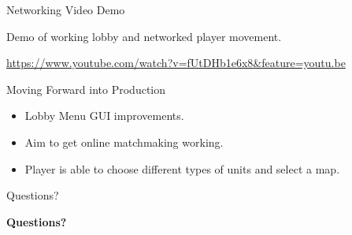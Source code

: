 \documentclass{beamer}
\begin{document}
\begin{frame}{Networking Video Demo}
	\begin{center}
	Demo of working lobby and networked player movement.
	\par
		\url{https://www.youtube.com/watch?v=fUtDHb1e6x8&feature=youtu.be}
	\end{center}
\end{frame}

\begin{frame}{Moving Forward into Production}
	\begin{itemize}
		\item Lobby Menu GUI improvements. \pause
		\item Aim to get online matchmaking working. \pause
		\item Player is able to choose different types of units and select a map.
	\end{itemize}
\end{frame}
\begin{frame}{Questions?}
\begin{center}
\textbf{Questions?}
\end{center}
\end{frame}
\end{document}

